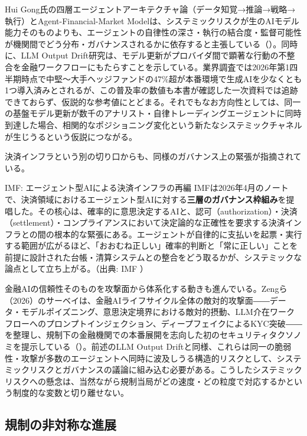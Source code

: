 Hui Gong氏の四層エージェントアーキテクチャ論（データ知覚→推論→戦略→執行）とAgent-Financial-Market Modelは、システミックリスクが生のAIモデル能力そのものよりも、エージェントの自律性の深さ・執行の結合度・監督可能性が機関間でどう分布・ガバナンスされるかに依存すると主張している（\cite{aiagentsfinmarkets2026}）。同時に、LLM Output Drift研究は、モデル更新がプロバイダ間で顕著な行動の不整合を金融ワークフローにもたらすことを示している。業界調査では2026年第1四半期時点で中堅〜大手ヘッジファンドの47\%超が本番環境で生成AIを少なくとも1つ導入済みとされるが、この普及率の数値も本書が確認した一次資料では追跡できておらず、仮説的な参考値にとどまる。それでもなお方向性としては、同一の基盤モデル更新が数千のアナリスト・自律トレーディングエージェントに同時到達した場合、相関的なポジショニング変化という新たなシステミックチャネルが生じうるという仮説につながる。

決済インフラという別の切り口からも、同様のガバナンス上の緊張が指摘されている。

\begin{casestudy}{IMF: エージェント型AIによる決済インフラの再編}
IMFは2026年4月のノートで、決済領域におけるエージェント型AIに対する\textbf{三層のガバナンス枠組み}を提唱した。その核心は、確率的に意思決定するAIと、認可（authorization）・決済（settlement）・コンプライアンスにおいて決定論的な正確性を要求する決済インフラとの間の根本的な緊張にある。エージェントが自律的に支払いを起票・実行する範囲が広がるほど、「おおむね正しい」確率的判断と「常に正しい」ことを前提に設計された台帳・清算システムとの整合をどう取るかが、システミックな論点として立ち上がる。（出典: IMF \cite{imfpayments2026}）
\end{casestudy}

金融AIの信頼性そのものを攻撃面から体系化する動きも進んでいる。Zengら（2026）のサーベイは、金融AIライフサイクル全体の敵対的攻撃面――データ・モデルポイズニング、意思決定境界における敵対的摂動、LLM介在ワークフローへのプロンプトインジェクション、ディープフェイクによるKYC突破――を整理し、規制下の金融機関での本番展開を志向した初のセキュリティタクソノミを提示している（\cite{trustworthyfintech2026}）。前述のLLM Output Driftと同様、これらは同一の脆弱性・攻撃が多数のエージェントへ同時に波及しうる構造的リスクとして、システミックリスクとガバナンスの議論に組み込む必要がある。こうしたシステミックリスクへの懸念は、当然ながら規制当局がどの速度・どの粒度で対応するかという制度的な変数と切り離せない。

\subsection{規制の非対称な進展}

